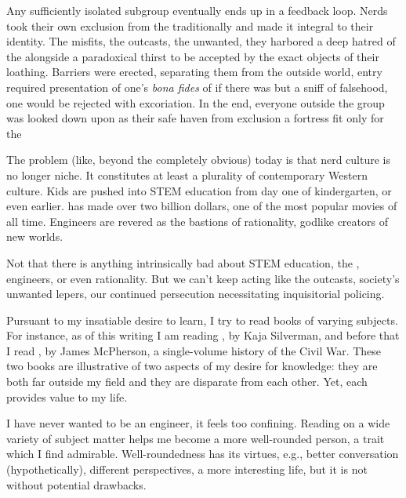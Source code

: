 \documentclass[../butidigress.tex]{subfiles}
\begin{document}
Any sufficiently isolated subgroup eventually ends up in a feedback loop.
Nerds took their own exclusion from the traditionally  and made it integral to their identity.
The misfits, the outcasts, the unwanted, they harbored a deep hatred of the  alongside a paradoxical thirst to be accepted by the exact objects of their loathing.
Barriers were erected, separating them from the outside world, entry required presentation of one's \textit{bona fides} of  if there was but a sniff of falsehood, one would be rejected with excoriation.
In the end, everyone outside the group was looked down upon as  their safe haven from exclusion a fortress fit only for the 

The problem (like, beyond the completely obvious) today is that nerd culture is no longer niche.
It constitutes at least a plurality of contemporary Western culture.
Kids are pushed into STEM education from day one of kindergarten, or even earlier.
 has made over two billion dollars, one of the most popular movies of all time.
Engineers are revered as the bastions of rationality, godlike creators of new worlds.

Not that there is anything intrinsically bad about STEM education, the , engineers, or even rationality.
But we can't keep acting like the outcasts, society's unwanted lepers, our continued persecution necessitating inquisitorial policing.


Pursuant to my insatiable desire to learn, I try to read books of varying subjects.
For instance, as of this writing I am reading , by Kaja Silverman, and before that I read , by James McPherson, a single-volume history of the Civil War.
These two books are illustrative of two aspects of my desire for knowledge: they are both far outside my field and they are disparate from each other.
Yet, each provides value to my life.

I have never wanted to be  an engineer, it feels too confining.
Reading on a wide variety of subject matter helps me become a more well-rounded person, a trait which I find admirable.
Well-roundedness has its virtues, e.g., better conversation (hypothetically), different perspectives, a more interesting life, but it is not without potential drawbacks.
\end{document}
